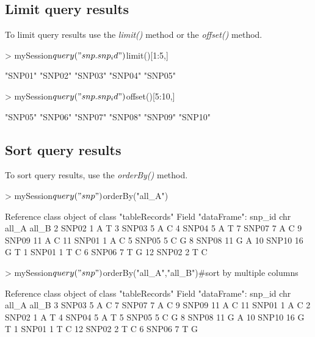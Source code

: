 \documentclass[a4paper,11pt]{article}
\begin{document}
\subsection*{Limit query results}
To limit query results use the \emph{limit()} method or the \emph{offset()} method.
\begin{Schunk}
\begin{Sinput}
> mySession$query("snp.snp_id")$limit()[1:5,]
\end{Sinput}
\begin{Soutput}
[1] "SNP01" "SNP02" "SNP03" "SNP04" "SNP05"
\end{Soutput}
\begin{Sinput}
> mySession$query("snp.snp_id")$offset()[5:10,]
\end{Sinput}
\begin{Soutput}
[1] "SNP05" "SNP06" "SNP07" "SNP08" "SNP09" "SNP10"
\end{Soutput}
\end{Schunk}


\subsection*{Sort query results}
To sort query results, use the \emph{orderBy()} method.
\begin{Schunk}
\begin{Sinput}
> mySession$query("snp")$orderBy("all_A")
\end{Sinput}
\begin{Soutput}
Reference class object of class "tableRecords"
Field "dataFrame":
   snp_id chr all_A all_B
2   SNP02   1     A     T
3   SNP03   5     A     C
4   SNP04   5     A     T
7   SNP07   7     A     C
9   SNP09  11     A     C
11  SNP01   1     A     C
5   SNP05   5     C     G
8   SNP08  11     G     A
10  SNP10  16     G     T
1   SNP01   1     T     C
6   SNP06   7     T     G
12  SNP02   2     T     C
\end{Soutput}
\begin{Sinput}
> mySession$query("snp")$orderBy("all_A","all_B")#sort by multiple columns
\end{Sinput}
\begin{Soutput}
Reference class object of class "tableRecords"
Field "dataFrame":
   snp_id chr all_A all_B
3   SNP03   5     A     C
7   SNP07   7     A     C
9   SNP09  11     A     C
11  SNP01   1     A     C
2   SNP02   1     A     T
4   SNP04   5     A     T
5   SNP05   5     C     G
8   SNP08  11     G     A
10  SNP10  16     G     T
1   SNP01   1     T     C
12  SNP02   2     T     C
6   SNP06   7     T     G
\end{Soutput}
\end{Schunk}
\end{document}

